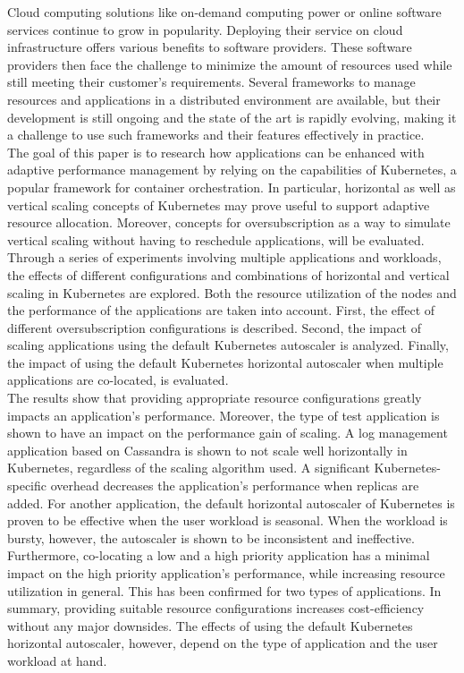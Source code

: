 \documentclass[../main.tex]{subfiles}
\begin{document}
    Cloud computing solutions like on-demand computing power or online software services continue to grow in popularity. Deploying their service on cloud infrastructure offers various benefits to software providers. These software providers then face the challenge to minimize the amount of resources used while still meeting their customer's requirements. Several frameworks to manage resources and applications in a distributed environment are available, but their development is still ongoing and the state of the art is rapidly evolving, making it a challenge to use such frameworks and their features effectively in practice.\\
    
    The goal of this paper is to research how applications can be enhanced with adaptive performance management by relying on the capabilities of Kubernetes, a popular framework for container orchestration. In particular, horizontal as well as vertical scaling concepts of Kubernetes may prove useful to support adaptive resource allocation. Moreover, concepts for oversubscription as a way to simulate vertical scaling without having to reschedule applications, will be evaluated.\\
    
    Through a series of experiments involving multiple applications and workloads, the effects of different configurations and combinations of horizontal and vertical scaling in Kubernetes are explored. Both the resource utilization of the nodes and the performance of the applications are taken into account. First, the effect of different oversubscription configurations is described. Second, the impact of scaling applications using the default Kubernetes autoscaler is analyzed. Finally, the impact of using the default Kubernetes horizontal autoscaler when multiple applications are co-located, is evaluated. \\
    
    The results show that providing appropriate resource configurations greatly impacts an application's performance. Moreover, the type of test application is shown to have an impact on the performance gain of scaling. A log management application based on Cassandra is shown to not scale well horizontally in Kubernetes, regardless of the scaling algorithm used. A significant Kubernetes-specific overhead decreases the application's performance when replicas are added. For another application, the default horizontal autoscaler of Kubernetes is proven to be effective when the user workload is seasonal. When the workload is bursty, however, the autoscaler is shown to be inconsistent and ineffective. Furthermore, co-locating a low and a high priority application has a minimal impact on the high priority application's performance, while increasing resource utilization in general. This has been confirmed for two types of applications. In summary, providing suitable resource configurations increases cost-efficiency without any major downsides. The effects of using the default Kubernetes horizontal autoscaler, however, depend on the type of application and the user workload at hand.
    
    
    
\end{document}
